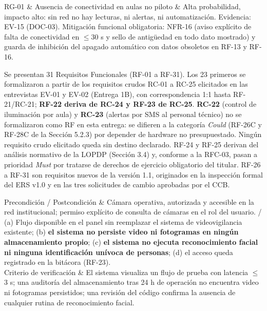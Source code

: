RG-01 & Ausencia de conectividad en aulas no piloto & Alta probabilidad, impacto alto: sin red no hay lecturas, ni alertas, ni automatizaci\'on. Evidencia: EV-15 (DOC-03). Mitigaci\'on funcional obligatoria: NFR-16 (aviso expl\'icito de falta de conectividad en $\leq$30 s y sello de antig\"uedad en todo dato mostrado) y guarda de inhibici\'on del apagado autom\'atico con datos obsoletos en RF-13 y RF-16. \\ \hline

Se presentan 31 Requisitos Funcionales (RF-01 a RF-31). Los 23 primeros se formalizaron a partir de los requisitos crudos RC-01 a RC-25 elicitados en las entrevistas EV-01 y EV-02 (Entrega 1B), con correspondencia 1:1 hasta RF-21/RC-21; \textbf{RF-22 deriva de RC-24 y RF-23 de RC-25}. \textbf{RC-22} (control de iluminaci\'on por aula) y \textbf{RC-23} (alertas por SMS al personal t\'ecnico) no se formalizaron como RF en esta entrega: se difieren a la categor\'ia \emph{Could} (RF-26C y RF-28C de la Secci\'on 5.2.3) por depender de hardware no presupuestado. Ning\'un requisito crudo elicitado queda sin destino declarado. RF-24 y RF-25 derivan del an\'alisis normativo de la LOPDP (Secci\'on 3.4) y, conforme a la RFC-03, pasan a prioridad \emph{Must} por tratarse de derechos de ejercicio obligatorio del titular. RF-26 a RF-31 son requisitos nuevos de la versi\'on 1.1, originados en la inspecci\'on formal del ERS v1.0 y en las tres solicitudes de cambio aprobadas por el CCB.

Precondici\'on / Postcondici\'on & C\'amara operativa, autorizada y accesible en la red institucional; permiso expl\'icito de consulta de c\'amaras en el rol del usuario. / (a) Flujo disponible en el panel sin reemplazar el sistema de videovigilancia existente; (b) \textbf{el sistema no persiste video ni fotogramas en ning\'un almacenamiento propio}; (c) \textbf{el sistema no ejecuta reconocimiento facial ni ninguna identificaci\'on un\'ivoca de personas}; (d) el acceso queda registrado en la bit\'acora (RF-23). \\ \hline
Criterio de verificaci\'on & El sistema visualiza un flujo de prueba con latencia $\leq$3 s; una auditor\'ia del almacenamiento tras 24 h de operaci\'on no encuentra video ni fotogramas persistidos; una revisi\'on del c\'odigo confirma la ausencia de cualquier rutina de reconocimiento facial. \\ \hline

